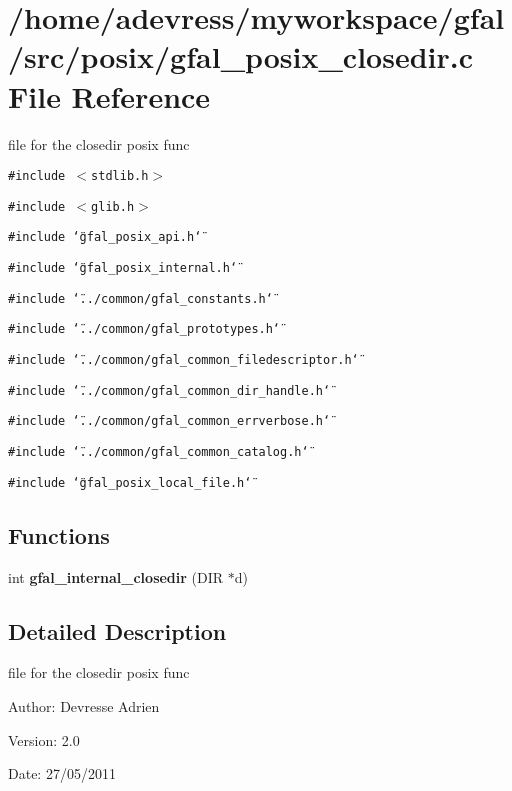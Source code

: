 \section{/home/adevress/myworkspace/gfal/src/posix/gfal\_\-posix\_\-closedir.c File Reference}
\label{gfal__posix__closedir_8c}
file for the closedir posix func 

{\tt \#include $<$stdlib.h$>$}\par
{\tt \#include $<$glib.h$>$}\par
{\tt \#include \char`\"{}gfal\_\-posix\_\-api.h\char`\"{}}\par
{\tt \#include \char`\"{}gfal\_\-posix\_\-internal.h\char`\"{}}\par
{\tt \#include \char`\"{}../common/gfal\_\-constants.h\char`\"{}}\par
{\tt \#include \char`\"{}../common/gfal\_\-prototypes.h\char`\"{}}\par
{\tt \#include \char`\"{}../common/gfal\_\-common\_\-filedescriptor.h\char`\"{}}\par
{\tt \#include \char`\"{}../common/gfal\_\-common\_\-dir\_\-handle.h\char`\"{}}\par
{\tt \#include \char`\"{}../common/gfal\_\-common\_\-errverbose.h\char`\"{}}\par
{\tt \#include \char`\"{}../common/gfal\_\-common\_\-catalog.h\char`\"{}}\par
{\tt \#include \char`\"{}gfal\_\-posix\_\-local\_\-file.h\char`\"{}}\par
\subsection*{Functions}
\begin{CompactItemize}
\item 
int \textbf{gfal\_\-internal\_\-closedir} (DIR $\ast$d)\label{gfal__posix__closedir_8c_1429791e321b4e09fee8a6c8acbc3d7d}

\end{CompactItemize}


\subsection{Detailed Description}
file for the closedir posix func 

\begin{Desc}
\item[Author:]Devresse Adrien \end{Desc}
\begin{Desc}
\item[Version:]2.0 \end{Desc}
\begin{Desc}
\item[Date:]27/05/2011 \end{Desc}
